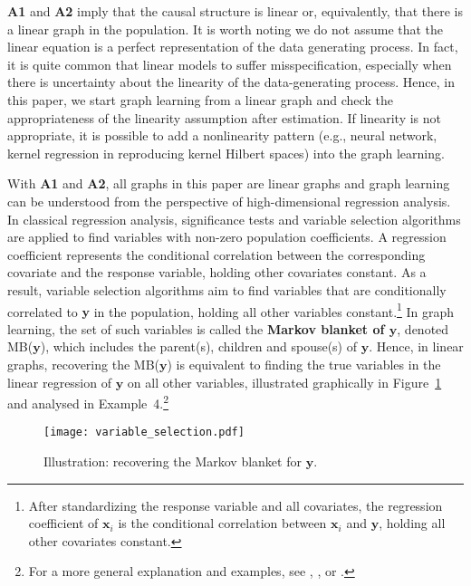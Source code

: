 \documentclass[11pt,review,authoryear]{elsarticle}
\begin{document}
\textbf{A1} and \textbf{A2} imply that the causal structure is linear or, equivalently, that there is a linear graph in the population. It is worth noting we do not assume that the linear equation is a perfect representation of the data generating process. In fact, it is quite common that linear models to suffer misspecification, especially when there is uncertainty about the linearity of the data-generating process. Hence, in this paper, we start graph learning from a linear graph and check the appropriateness of the linearity assumption after estimation. If linearity is not appropriate, it is possible to add a nonlinearity pattern (e.g., neural network, kernel regression in reproducing kernel Hilbert spaces) into the graph learning.

With \textbf{A1} and \textbf{A2}, all graphs in this paper are linear graphs and graph learning can be understood from the perspective of high-dimensional regression analysis. In classical regression analysis, significance tests and variable selection algorithms are applied to find variables with non-zero population coefficients. A regression coefficient represents the conditional correlation between the corresponding covariate and the response variable, holding other covariates constant. As a result, variable selection algorithms aim to find variables that are conditionally correlated to $\mathbf{y}$ in the population, holding all other variables constant.\footnote{After standardizing the response variable and all covariates, the regression coefficient of $\mathbf{x}_i$ is the conditional correlation between $\mathbf{x}_i$ and $\mathbf{y}$, holding all other covariates constant.} In graph learning, the set of such variables is called the \textbf{Markov blanket of $\mathbf{y}$}, denoted MB($\mathbf{y}$), which includes the parent(s), children and spouse(s) of $\mathbf{y}$. Hence, in linear graphs, recovering the MB($\mathbf{y}$) is equivalent to finding the true variables in the linear regression of $\mathbf{y}$ on all other variables, illustrated graphically in Figure~\ref{fig:variable_selection} and analysed in Example~4.\footnote{For a more general explanation and examples, see \citet{pearl2009causality}, \citet{koller2009probabilistic}, or \citet{scutari2014bayesian}.}

\begin{figure}[h]
  \centering
  \texttt{[image: variable\_selection.pdf]}
  \caption{Illustration: recovering the Markov blanket for $\mathbf{y}$.}
  \label{fig:variable_selection}
\end{figure}
\end{document}
